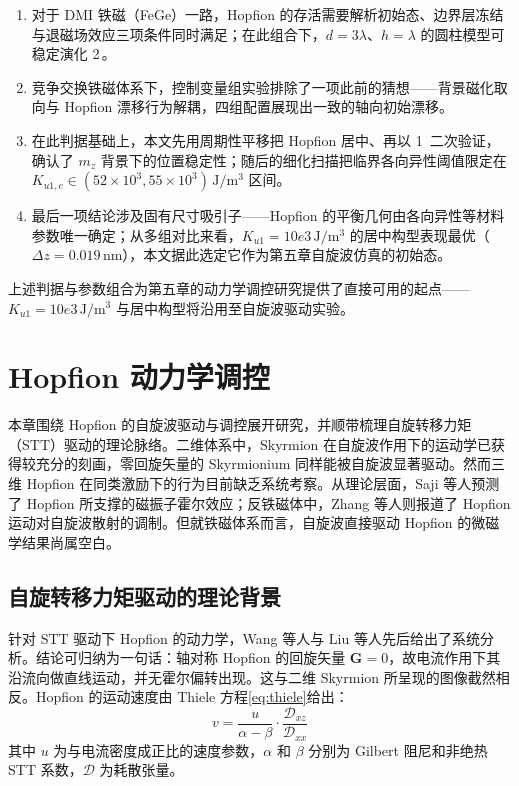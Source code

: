 \documentclass{article}
\begin{document}
\begin{enumerate}[label=(\arabic*)]
  \item 对于 DMI 铁磁（FeGe）一路，Hopfion 的存活需要解析初始态、边界层冻结与退磁场效应三项条件同时满足；在此组合下，$d = 3\lambda$、$h = \lambda$ 的圆柱模型可稳定演化 2\,。
  \item 竞争交换铁磁体系下，控制变量组实验排除了一项此前的猜想——背景磁化取向与 Hopfion 漂移行为解耦，四组配置展现出一致的轴向初始漂移。
  \item 在此判据基础上，本文先用周期性平移把 Hopfion 居中、再以 1\, 二次验证，确认了 $m_z$ 背景下的位置稳定性；随后的细化扫描把临界各向异性阈值限定在 $K_{u1,c} \in (52\times10^{3}, 55\times10^{3}) \, \mathrm{J/m^3}$ 区间。
  \item 最后一项结论涉及固有尺寸吸引子——Hopfion 的平衡几何由各向异性等材料参数唯一确定；从多组对比来看，$K_{u1} = 10e3\,\mathrm{J/m^3}$ 的居中构型表现最优（$\Delta z = 0.019\,\mathrm{nm}$），本文据此选定它作为第五章自旋波仿真的初始态。
\end{enumerate}

上述判据与参数组合为第五章的动力学调控研究提供了直接可用的起点——$K_{u1} = 10e3\,\mathrm{J/m^3}$ 与居中构型将沿用至自旋波驱动实验。

\chapter{Hopfion 动力学调控}

本章围绕 Hopfion 的自旋波驱动与调控展开研究，并顺带梳理自旋转移力矩（STT）驱动的理论脉络。二维体系中，Skyrmion 在自旋波作用下的运动学已获得较充分的刻画\cite{ding2015motion,huang2023transient}，零回旋矢量的 Skyrmionium 同样能被自旋波显著驱动\cite{shen2018skyrmionium}。然而三维 Hopfion 在同类激励下的行为目前缺乏系统考察。从理论层面，Saji 等人预测了 Hopfion 所支撑的磁振子霍尔效应\cite{saji2023magnonic}；反铁磁体中，Zhang 等人则报道了 Hopfion 运动对自旋波散射的调制\cite{zhang2023magnon}。但就铁磁体系而言，自旋波直接驱动 Hopfion 的微磁学结果尚属空白。


\section{自旋转移力矩驱动的理论背景}

针对 STT 驱动下 Hopfion 的动力学，Wang 等人\cite{wang2019current}与 Liu 等人\cite{liu2020three}先后给出了系统分析。结论可归纳为一句话：轴对称 Hopfion 的回旋矢量 $\mathbf{G} = 0$，故电流作用下其沿流向做直线运动，并无霍尔偏转出现。这与二维 Skyrmion 所呈现的图像截然相反。Hopfion 的运动速度由 Thiele 方程\ref{eq:thiele}给出：
\begin{equation}
  v = \frac{u}{\alpha - \beta} \cdot \frac{\mathcal{D}_{xz}}{\mathcal{D}_{xx}}
  \label{eq:hopfion-stt-velocity}
\end{equation}
其中 $u$ 为与电流密度成正比的速度参数，$\alpha$ 和 $\beta$ 分别为 Gilbert 阻尼和非绝热 STT 系数，$\mathcal{D}$ 为耗散张量。
\end{document}
